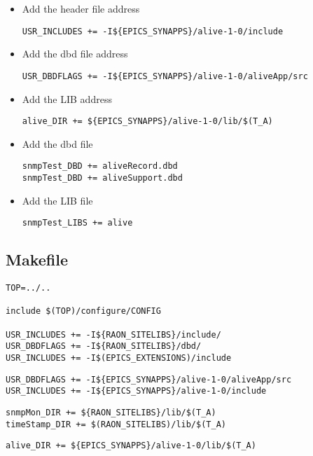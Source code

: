 \documentclass[11pt
  , a4paper
  , article
  , oneside
]{memoir}
\begin{document}
\begin{itemize}
\item Add the header file address
\begin{lstlisting}[style=termstyle]
USR_INCLUDES += -I${EPICS_SYNAPPS}/alive-1-0/include
\end{lstlisting}
\item Add the dbd file address
\begin{lstlisting}[style=termstyle]
USR_DBDFLAGS += -I${EPICS_SYNAPPS}/alive-1-0/aliveApp/src
\end{lstlisting}
\item Add the LIB address
\begin{lstlisting}[style=termstyle]
alive_DIR += ${EPICS_SYNAPPS}/alive-1-0/lib/$(T_A)
\end{lstlisting}
\item Add the dbd file
\begin{lstlisting}[style=termstyle]
snmpTest_DBD += aliveRecord.dbd   
snmpTest_DBD += aliveSupport.dbd
\end{lstlisting}
\item Add the LIB file
\begin{lstlisting}[style=termstyle]
snmpTest_LIBS += alive
\end{lstlisting}
\end{itemize}

\subsection{Makefile}
\begin{lstlisting}[style=termstyle]
TOP=../..

include $(TOP)/configure/CONFIG

USR_INCLUDES += -I${RAON_SITELIBS}/include/
USR_DBDFLAGS += -I${RAON_SITELIBS}/dbd/
USR_INCLUDES += -I$(EPICS_EXTENSIONS)/include
\end{lstlisting}
\begin{lstlisting}[style=termstyle]
USR_DBDFLAGS += -I${EPICS_SYNAPPS}/alive-1-0/aliveApp/src
USR_INCLUDES += -I${EPICS_SYNAPPS}/alive-1-0/include
\end{lstlisting}

\begin{lstlisting}[style=termstyle]
snmpMon_DIR += ${RAON_SITELIBS}/lib/$(T_A)
timeStamp_DIR += $(RAON_SITELIBS)/lib/$(T_A)
\end{lstlisting}
\begin{lstlisting}[style=termstyle]
alive_DIR += ${EPICS_SYNAPPS}/alive-1-0/lib/$(T_A)
\end{lstlisting}
\end{document}
